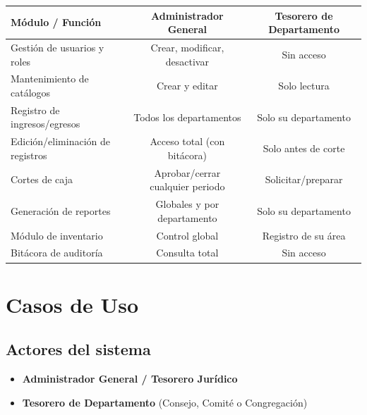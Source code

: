 \documentclass[11pt,a4paper]{article}
\begin{document}
	\begin{table}[h!]
		\centering
		\renewcommand{\arraystretch}{1.2}
		\begin{tabularx}{\textwidth}{X c c}
			\toprule
			\textbf{Módulo / Función} & \textbf{Administrador General} & \textbf{Tesorero de Departamento} \\
			\midrule
			Gestión de usuarios y roles & Crear, modificar, desactivar & Sin acceso \\
			Mantenimiento de catálogos & Crear y editar & Solo lectura \\
			Registro de ingresos/egresos & Todos los departamentos & Solo su departamento \\
			Edición/eliminación de registros & Acceso total (con bitácora) & Solo antes de corte \\
			Cortes de caja & Aprobar/cerrar cualquier periodo & Solicitar/preparar \\
			Generación de reportes & Globales y por departamento & Solo su departamento \\
			Módulo de inventario & Control global & Registro de su área \\
			Bitácora de auditoría & Consulta total & Sin acceso \\
			\bottomrule
		\end{tabularx}
	\end{table}
	

	\section{Casos de Uso}
	
	\subsection{Actores del sistema}
	\begin{itemize}
		\item \textbf{Administrador General / Tesorero Jurídico}
		\item \textbf{Tesorero de Departamento} (Consejo, Comité o Congregación)
	\end{itemize}
	
\end{document}
